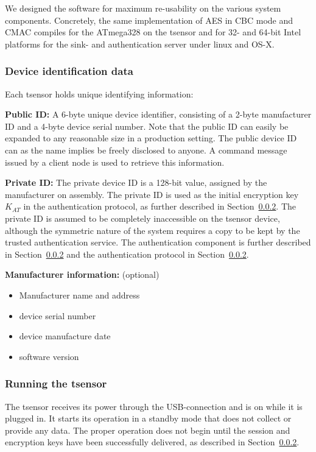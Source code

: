 We designed the software for maximum re-usability on the various system components. Concretely, the same implementation of AES in CBC mode and CMAC compiles for the ATmega328 on the tsensor and for 32- and 64-bit Intel platforms for the sink- and authentication server under linux and OS-X.

\subsubsection{Device identification data}

Each tsensor holds unique identifying information:
\begin{description}
\item \textbf{Public ID:} A 6-byte unique device identifier, consisting of a 2-byte manufacturer ID and a 4-byte device serial number. Note that the public ID can easily be expanded to any reasonable size in a production setting. The public device ID can as the name implies be freely disclosed to anyone. A command message issued by a client node is used to retrieve this information.
\item \textbf{Private ID:} The private device ID is a 128-bit value, assigned by the manufacturer on assembly. The private ID is used as the initial encryption key $K_{AT}$ in the authentication protocol, as further described in Section~\ref{}. The private ID is assumed to be completely inaccessible on the tsensor device, although the symmetric nature of the system requires a copy to be kept by the trusted authentication service. The authentication component is further described in Section~\ref{} and the authentication protocol in Section~\ref{}.
\item \textbf{Manufacturer information:} (optional)
\begin{itemize}
\item Manufacturer name and address
\item device serial number
\item device manufacture date
\item software version
\end{itemize}
\end{description}

\subsubsection{Running the tsensor}

The tsensor receives its power through the USB-connection and is on while it is plugged in. It starts its operation in a standby mode that does not collect or provide any data. The proper operation does not begin until the session and encryption keys have been successfully delivered, as described in Section~\ref{}.

